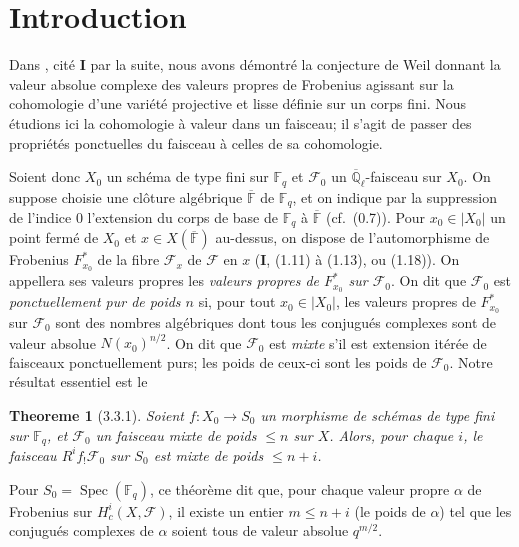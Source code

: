 \documentclass[12pt,a4paper]{article}
\theoremstyle{plain}
\newtheorem{theoreme}{Theoreme}[section]
\theoremstyle{definition}
\theoremstyle{definition}
\theoremstyle{remark}
\DeclareMathOperator{\Spec}{Spec}
\begin{document}
\newpage


\section*{Introduction}

Dans \cite{WeilI}, cit\'e \textbf{I} par la suite, nous avons d\'emontr\'e la conjecture de Weil donnant la valeur absolue complexe des valeurs propres de Frobenius agissant sur la cohomologie d'une vari\'et\'e projective et lisse d\'efinie sur un corps fini. Nous \'etudions ici la cohomologie \`a valeur dans un faisceau; il s'agit de passer des propri\'et\'es ponctuelles du faisceau \`a celles de sa cohomologie.

Soient donc $X_0$ un sch\'ema de type fini sur $\mathbb{F}_q$ et $\mathscr{F}_0$ un $\overline{\mathbb{Q}}_\ell$-faisceau sur $X_0$. On suppose choisie une cl\^oture alg\'ebrique $\overline{\mathbb{F}}$ de $\mathbb{F}_q$, et on indique par la suppression de l'indice $0$ l'extension du corps de base de $\mathbb{F}_q$ \`a $\overline{\mathbb{F}}$ (cf.~(0.7)). Pour $x_0 \in |X_0|$ un point ferm\'e de $X_0$ et $x \in X(\overline{\mathbb{F}})$ au-dessus, on dispose de l'automorphisme de Frobenius $F_{x_0}^*$ de la fibre $\mathscr{F}_x$ de $\mathscr{F}$ en $x$ (\textbf{I}, (1.11) \`a (1.13), ou (1.18)). On appellera ses valeurs propres les \emph{valeurs propres de $F_{x_0}^*$ sur $\mathscr{F}_0$}. On dit que $\mathscr{F}_0$ est \emph{ponctuellement pur de poids $n$} si, pour tout $x_0 \in |X_0|$, les valeurs propres de $F_{x_0}^*$ sur $\mathscr{F}_0$ sont des nombres alg\'ebriques dont tous les conjugu\'es complexes sont de valeur absolue $N(x_0)^{n/2}$. On dit que $\mathscr{F}_0$ est \emph{mixte} s'il est extension it\'er\'ee de faisceaux ponctuellement purs; les poids de ceux-ci sont les poids de $\mathscr{F}_0$. Notre r\'esultat essentiel est le

\begin{theoreme}[3.3.1]
Soient $f: X_0 \to S_0$ un morphisme de sch\'emas de type fini sur $\mathbb{F}_q$, et $\mathscr{F}_0$ un faisceau mixte de poids $\leq n$ sur $X$. Alors, pour chaque $i$, le faisceau $R^i f_! \mathscr{F}_0$ sur $S_0$ est mixte de poids $\leq n+i$.
\end{theoreme}

Pour $S_0 = \Spec(\mathbb{F}_q)$, ce th\'eor\`eme dit que, pour chaque valeur propre $\alpha$ de Frobenius sur $H_c^i(X, \mathscr{F})$, il existe un entier $m \leq n+i$ (le poids de $\alpha$) tel que les conjugu\'es complexes de $\alpha$ soient tous de valeur absolue $q^{m/2}$.
\end{document}
